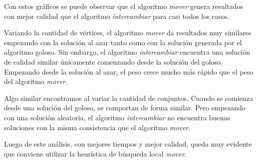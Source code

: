 Con estos gráficos se puede observar que el algoritmo \textit{mover} genera
resultados con mejor calidad que el algoritmo \textit{intercambiar} para casi
todos los casos.

Variando la cantidad de vértices, el algoritmo \textit{mover} da resultados muy
similares empezando con la solución al azar tanto como con la solución generada
por el algoritmo goloso. Sin embargo, el algoritmo \textit{intercambiar}
encuentra una solución de calidad similar únicamente comenzando desde la
solución del goloso.  Empezando desde la solución al azar, el peso crece mucho
más rápido que el peso del algoritmo \textit{mover}.

Algo similar encontramos al variar la cantidad de conjuntos. Cuando se comienza
desde una solución del goloso, se comportan de forma similar. Pero empezando
con una solución aleatoria, el algoritmo \textit{intercambiar} no encuentra
buenas soluciones con la misma consistencia que el algoritmo \textit{mover}.

Luego de este análisis, con mejores tiempos y mejor calidad, queda muy evidente
que conviene utilizar la heurística de búsqueda local \textit{mover}.
